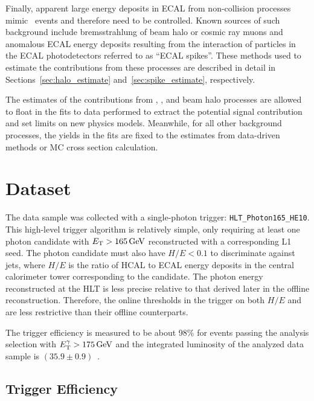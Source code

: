 Finally, apparent large energy deposits in ECAL from non-collision processes mimic \gmet\ events and therefore need to be controlled. 
Known sources of such background include bremsstrahlung of beam halo or cosmic ray muons and anomalous ECAL energy deposits resulting from the interaction of particles in the ECAL photodetectors referred to as ``ECAL spikes''. 
These methods used to estimate the contributions from these processes are described in detail in Sections~\ref{sec:halo_estimate} and~\ref{sec:spike_estimate}, respectively.

The estimates of the contributions from \zinvg, \wlng, and beam halo processes are allowed to float in the fits to data performed to extract the potential signal contribution and set limits on new physics models. %
Meanwhile, for all other background processes, the yields in the fits are fixed to the estimates from data-driven methods or MC cross section calculation. 

\section{Dataset}
\label{sec:dataset}

The data sample was collected with a single-photon trigger: \texttt{HLT\_Photon165\_HE10}.
This high-level trigger algorithm is relatively simple, only requiring at least one photon candidate with $E_{\mathrm{T}} > 165\,\text{Ge\hspace{-.08em}V}$ reconstructed with a corresponding L1 seed.
The photon candidate must also have $H/E < 0.1$ to discriminate against jets, where $H/E$ is the ratio of HCAL to ECAL energy deposits in the central calorimeter tower corresponding to the candidate.
The photon energy reconstructed at the HLT is less precise relative to that derived later in the offline reconstruction. 
Therefore, the online thresholds in the trigger on both $H/E$ and \ETg are less restrictive than their offline counterparts.

The trigger efficiency is measured to be about 98\% for events passing the analysis selection with $E_{\mathrm{T}}^{\gamma} > 175\,\text{Ge\hspace{-.08em}V}$ and the integrated luminosity of the analyzed data sample is $(35.9\pm0.9)$\fbinv~\cite{CMS:2017sdi}.

\subsection{Trigger Efficiency}
\label{sec:triggereff}

